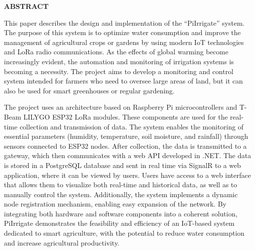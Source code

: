 \thispagestyle{abstractpagestyle}

\vspace*{36pt}

\begin{center}
    \textbf{\fontsize{20pt}{24pt} \selectfont ABSTRACT}
\end{center}

\vspace{24pt}

This paper describes the design and implementation of the “PiIrrigate” system. The purpose of this system is to optimize water consumption and improve the management of agricultural crops or gardens by using modern IoT technologies and LoRa radio communications. As the effects of global warming become increasingly evident, the automation and monitoring of irrigation systems is becoming a necessity. The project aims to develop a monitoring and control system intended for farmers who need to oversee large areas of land, but it can also be used for smart greenhouses or regular gardening.
\vspace{12pt}

The project uses an architecture based on Raspberry Pi microcontrollers and T-Beam LILYGO ESP32 LoRa modules. These components are used for the real-time collection and transmission of data. The system enables the monitoring of essential parameters (humidity, temperature, soil moisture, and rainfall) through sensors connected to ESP32 nodes. After collection, the data is transmitted to a gateway, which then communicates with a web API developed in .NET. The data is stored in a PostgreSQL database and sent in real time via SignalR to a web application, where it can be viewed by users.
\vspace{12pt}
Users have access to a web interface that allows them to visualize both real-time and historical data, as well as to manually control the system. Additionally, the system implements a dynamic node registration mechanism, enabling easy expansion of the network.
\vspace{12pt}
By integrating both hardware and software components into a coherent solution, PiIrrigate demonstrates the feasibility and efficiency of an IoT-based system dedicated to smart agriculture, with the potential to reduce water consumption and increase agricultural productivity.
\vfill